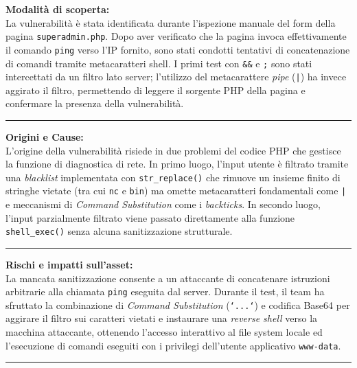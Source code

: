 \documentclass[11pt]{report}
\begin{document}
	\begin{tcolorbox}[colback=gray!5, colframe=headerblue, arc=3pt, boxrule=0.8pt, breakable]
		\textbf{Modalità di scoperta:}\\
		La vulnerabilità è stata identificata durante l'ispezione manuale del form della pagina \texttt{superadmin.php}. Dopo aver verificato che la pagina invoca effettivamente il comando \texttt{ping} verso l'IP fornito, sono stati condotti tentativi di concatenazione di comandi tramite metacaratteri shell. I primi test con \texttt{\&\&} e \texttt{;} sono stati intercettati da un filtro lato server; l'utilizzo del metacarattere \textit{pipe} (\texttt{|}) ha invece aggirato il filtro, permettendo di leggere il sorgente PHP della pagina e confermare la presenza della vulnerabilità.
		
		\vspace{0.2cm}\hrule\vspace{0.2cm}
		
		\textbf{Origini e Cause:}\\
		L'origine della vulnerabilità risiede in due problemi del codice PHP che gestisce la funzione di diagnostica di rete. In primo luogo, l'input utente è filtrato tramite una \textit{blacklist} implementata con \texttt{str\_replace()} che rimuove un insieme finito di stringhe vietate (tra cui \texttt{nc} e \texttt{bin}) ma omette metacaratteri fondamentali come \texttt{|} e meccanismi di \textit{Command Substitution} come i \textit{backticks}. In secondo luogo, l'input parzialmente filtrato viene passato direttamente alla funzione \texttt{shell\_exec()} senza alcuna sanitizzazione strutturale.
		
		\vspace{0.2cm}\hrule\vspace{0.2cm}
		
		\textbf{Rischi e impatti sull'asset:}\\
		La mancata sanitizzazione consente a un attaccante di concatenare istruzioni arbitrarie alla chiamata \texttt{ping} eseguita dal server. Durante il test, il team ha sfruttato la combinazione di \textit{Command Substitution} (\texttt{`...`}) e codifica Base64 per aggirare il filtro sui caratteri vietati e instaurare una \textit{reverse shell} verso la macchina attaccante, ottenendo l'accesso interattivo al file system locale ed l'esecuzione di comandi eseguiti con i privilegi dell'utente applicativo \texttt{www-data}.
		
		\vspace{0.2cm}\hrule\vspace{0.2cm}
		

\end{tcolorbox}
\end{document}
